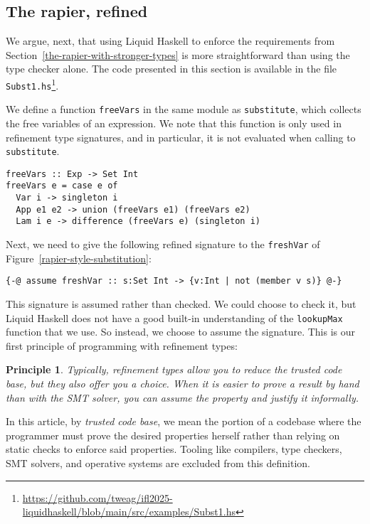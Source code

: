 \documentclass[sigconf]{acmart}
\newcommand{\tc}[1]{{\small\texttt{#1}}}
\newcommand{\sourcefile}[1]{\tc{#1}\footnote{\scriptsize\url{https://github.com/tweag/ifl2025-liquidhaskell/blob/main/src/examples/#1}}}
\newtheorem{principle}{Principle}
\begin{document}
\subsection{The rapier, refined}
\label{the-rapier-with-refinement-types}

We argue, next, that using Liquid Haskell to enforce the
requirements from Section~\ref{the-rapier-with-stronger-types} is more
straightforward than using the type checker alone. The code presented in this section is available in the file
\sourcefile{Subst1.hs}.

We define a function \tc{freeVars} in the same module as \tc{subs\-ti\-tute},
which collects the free variables of an expression. We note that this function
is only used in refinement type signatures, and in particular, it is not evaluated
when calling to \tc{substitute}.

\begin{verbatim}
freeVars :: Exp -> Set Int
freeVars e = case e of
  Var i -> singleton i
  App e1 e2 -> union (freeVars e1) (freeVars e2)
  Lam i e -> difference (freeVars e) (singleton i)
\end{verbatim}

Next, we need to give the following refined signature to the \tc{freshVar} of
Figure~\ref{rapier-style-substitution}:
\begin{verbatim}
{-@ assume freshVar :: s:Set Int -> {v:Int | not (member v s)} @-}
\end{verbatim}
This signature is assumed rather than checked. We could choose to check it, but
Liquid Haskell does not have a good built-in understanding of the \tc{lookupMax}
function that we use. So instead, we choose to assume the signature. This is our
first principle of programming with refinement types:

\begin{principle}
\label{assumption-principle}
  Typically, refinement types allow you to reduce the trusted code base, but they also offer
    you a choice. When it is easier to prove a result by
    hand than with the SMT solver, you can assume the property and
    justify it informally.
\end{principle}

In this article, by \emph{trusted code base}, we mean the portion of a
codebase where the programmer must prove the desired properties
herself rather than relying on static checks to enforce said properties.
Tooling like compilers, type checkers, SMT solvers, and operative systems
are excluded from this definition.
\end{document}
